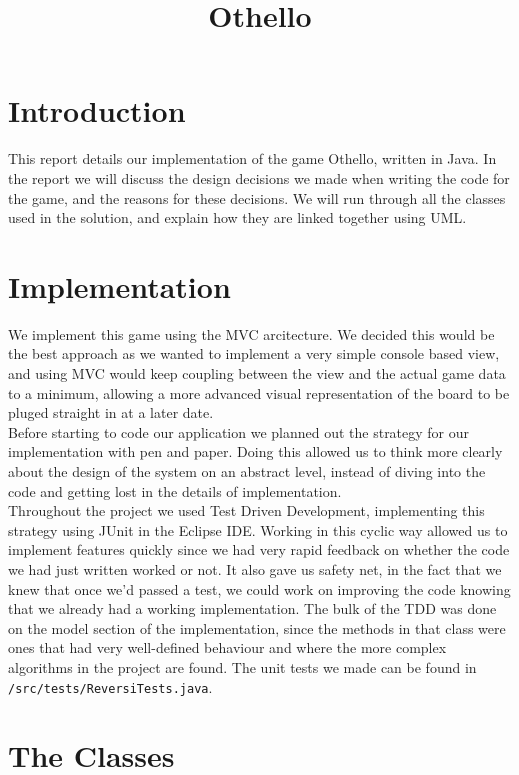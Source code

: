 \documentclass[11pt,a4paper,oneside]{report}
\begin{document}
\title{Othello}

\maketitle

\section*{Introduction}
This report details our implementation of the game Othello, written in Java. In the report we will discuss the design decisions we made when writing the code for the game, and the reasons for these decisions. We will run through all the classes used in the solution, and explain how they are linked together using UML. 

\section*{Implementation}
We implement this game using the MVC arcitecture. We decided this would be the best approach as we wanted to implement a very simple console based view, and using MVC would keep coupling between the view and the actual game data to a minimum, allowing a more advanced visual representation of the board to be pluged straight in at a later date.\\
\ident Before starting to code our application we planned out the strategy for our implementation with pen and paper. Doing this allowed us to think more clearly about the design of the system on an abstract level, instead of diving into the code and getting lost in the details of implementation.\\
\ident Throughout the project we used Test Driven Development, implementing this strategy using JUnit in the Eclipse IDE. Working in this cyclic way allowed us to implement features quickly since we had very rapid feedback on whether the code we had just written worked or not. It also gave us safety net, in the fact that we knew that once we'd passed a test, we could work on improving the code knowing that we already had a working implementation. The bulk of the TDD was done on the model section of the implementation, since the methods in that class were ones that had very well-defined behaviour and where the more complex algorithms in the project are found. The unit tests we made can be found in \texttt{/src/tests/ReversiTests.java}.

\section*{The Classes}
\end{document}
